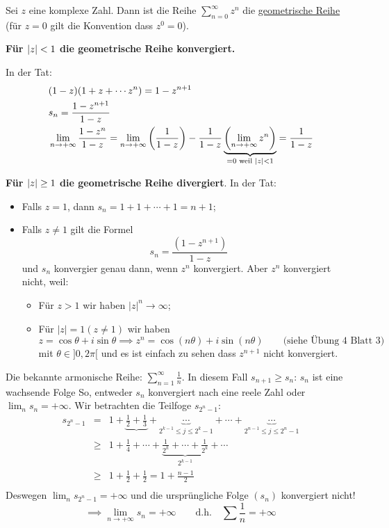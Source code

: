 \begin{Bsp}
Sei $z$ eine komplexe Zahl. Dann ist die Reihe 
$\sum^\infty_{n=0}z^n$ die \ul{geometrische Reihe} (f\"ur $z=0$ gilt 
die Konvention dass $z^0=0$).

\medskip

{\bf F\"ur $\mathopen| z \mathclose|<1$ die geometrische Reihe konvergiert.}
 
In der Tat:
  \begin{align*}
    &(1-z)(1+z+\cdots z^n)=1-z^{n+1}\\
    &s_n=\frac{1-z^{n+1}}{1-z}\\
    &\lim_{n\to+\infty}\frac{1-z^n}{1-z}=\lim_{n\to+\infty}\left( 
\frac{1}{1-z} \right)-\frac{1}{1-z}\underbrace{\left( \lim_{n\to+\infty}z^n 
\right)}_{=0 \text{ weil } \mathopen| z \mathclose|<1}=\frac{1}{1-z}
  \end{align*}

\medskip

{\bf  Für $\mathopen| z \mathclose|\geq 1$ die geometrische Reihe divergiert}.
In der Tat:
\begin{itemize}
\item Falls $z=1$, dann $s_n=1+1+\cdots+1=n+1$;
\item Falls $z\neq 1$ gilt die Formel
\[s_n=\frac{(1-z^{n+1})}{1-z}\] 
und $s_n$ konvergier genau dann, wenn $z^n$ konvergiert.
Aber $z^n$ konvergiert nicht, weil:
\begin{itemize}
\item F\"ur $z>1$ wir haben $|z|^n\to \infty$;
\item F\"ur $|z|=1 (z\neq 1)$ wir haben
\[z=\cos\theta+i\sin\theta\implies z^n=\cos(n\theta)+i\sin(n\theta)
\qquad \mbox{(siehe \"Ubung 4 Blatt 3)}\]
mit $\theta\in ]0, 2\pi[$
und es ist einfach zu sehen dass $z^{n+1}$ nicht konvergiert.
\end{itemize}
\end{itemize}

\end{Bsp}

\begin{Bsp}
Die bekannte armonische Reihe: $\sum^\infty_{n=1}\frac{1}{n}$.
In diesem Fall $s_{n+1}\geq s_n$: $s_n$ ist eine wachsende Folge
So, entweder $s_n$ konvergiert nach eine
reele Zahl oder $\lim_n s_n =+\infty$. Wir betrachten die
Teilfoge $s_{2^n-1}$:
\begin{eqnarray*}
s_{2^n-1}&=&1+\underbrace{\frac{1}{2}+\frac{1}{3}}+
\underbrace{\cdots}_{2^{k-1}\leq j\leq 2^k-1}+\cdots+
\underbrace{\cdots}_{2^{n-1}\leq j\leq 2^n-1}\\
&\geq &1+\frac{1}{4}+\cdots+\underbrace{\frac{1}{2^k}+\cdots+\frac{1}{2^k}}_{2^{k-1}}
+\cdots\\
&\geq &1+\frac{1}{2}+\frac{1}{2} = 1+\frac{n-1}{2}\\
\end{eqnarray*}
Deswegen $\lim_n s_{2^n-1}=+\infty$ und 
die ursprüngliche Folge $(s_n)$ konvergiert nicht! 
\[\implies \lim_{n\to+\infty}s_n=+\infty \qquad \mbox{d.h.}
\quad \sum\frac{1}{n}=+\infty\]
\end{Bsp}
